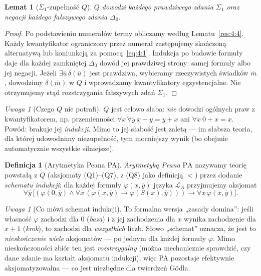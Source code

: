 \documentclass[11pt,a4paper]{article}
\numberwithin{equation}{section}
\theoremstyle{plain}
\newtheorem{lemat}[twierdzenie]{Lemat}
\theoremstyle{definition}
\newtheorem{definicja}[twierdzenie]{Definicja}
\theoremstyle{remark}
\newtheorem{uwaga}[twierdzenie]{Uwaga}
\begin{document}
\begin{lemat}[$\Sigma_1$-zupełność $Q$]\label{res:4:7}
$Q$ dowodzi każdego prawdziwego zdania $\Sigma_1$ oraz negacji każdego fałszywego zdania $\Delta_0$.
\end{lemat}
\begin{proof}
Po podstawieniu numerałów termy obliczamy według Lematu~\ref{res:4:4}. Każdy kwantyfikator ograniczony przez numerał zastępujemy skończoną alternatywą lub koniunkcją za pomocą~\eqref{eq:4:1}. Indukcja po budowie formuły daje dla każdej zamkniętej $\Delta_0$ dowód jej prawdziwej strony: samej formuły albo jej negacji. Jeżeli $\exists\overline u\,\delta(\overline u)$ jest prawdziwa, wybieramy rzeczywistych świadków $\overline m$, dowodzimy $\delta(\overline m)$ w $Q$ i wprowadzamy kwantyfikatory egzystencjalne. Nie otrzymujemy stąd rozstrzygania fałszywych zdań $\Sigma_1$.
\end{proof}

\begin{uwaga}[Czego $Q$ nie potrafi]\label{res:4:8}
$Q$ jest celowo słaba: \emph{nie} dowodzi ogólnych praw z kwantyfikatorem, np. przemienności $\forall x\,\forall y\ x+y=y+x$ ani $\forall x\ 0+x=x$. Powód: brakuje jej \emph{indukcji}. Mimo to jej słabość jest zaletą --- im słabsza teoria, dla której udowodnimy niezupełność, tym mocniejszy wynik (bo obejmie automatycznie wszystkie silniejsze).
\end{uwaga}

\begin{definicja}[Arytmetyka Peana PA]\label{res:4:9}
\emph{Arytmetyką Peana} $\mathrm{PA}$ nazywamy teorię powstałą z $Q$ (aksjomaty (Q1)--(Q7), z (Q8) jako definicją $<$) przez dodanie \emph{schematu indukcji}: dla każdej formuły $\varphi(x,\overline y)$ języka $\mathcal L_A$ przyjmujemy aksjomat
\[
\forall\overline y\,\bigl[(\varphi(0,\overline y)\land\forall x\,(\varphi(x,\overline y)\to\varphi(S(x),\overline y)))\to\forall x\,\varphi(x,\overline y)\bigr].
\]
\end{definicja}

\begin{uwaga}[Co mówi schemat indukcji]\label{res:4:10}
To formalna wersja „zasady domina”: jeśli własność $\varphi$ zachodzi dla $0$ (\emph{baza}) i z jej zachodzenia dla $x$ wynika zachodzenie dla $x+1$ (\emph{krok}), to zachodzi dla \emph{wszystkich} liczb. Słowo „schemat” oznacza, że jest to \emph{nieskończenie wiele} aksjomatów --- po jednym dla każdej formuły $\varphi$. Mimo nieskończoności zbiór ten jest \emph{rozstrzygalny} (można mechanicznie sprawdzić, czy dane zdanie ma kształt aksjomatu indukcji), więc PA pozostaje efektywnie aksjomatyzowalna --- co jest niezbędne dla twierdzeń Gödla.
\end{uwaga}
\end{document}
